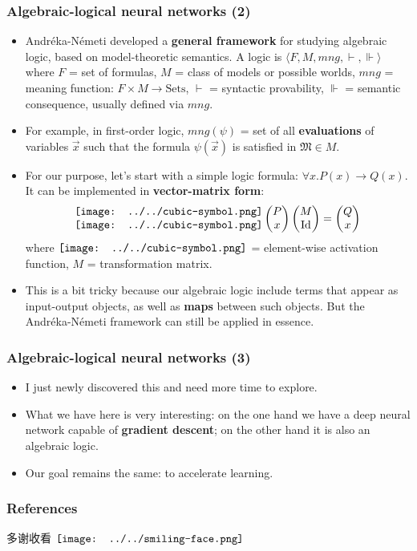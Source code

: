 \documentclass[16pt]{beamer}
\newcommand{\cc}[2]{#1}
\newcommand{\cc}[2]{#2}
\newcommand{\smiley}{$\vcenter{\hbox{\texttt{[image: ../../smiling-face.png]}}}$}
\newcommand{\cubic}{\vcenter{\hbox{\texttt{[image: ../../cubic-symbol.png]}}}}
\begin{document}
\begin{frame}
\frametitle{Algebraic-logical neural networks (2)}
\fontsize{10pt}{8}\selectfont
\begin{itemize}
	\item Andr\'{e}ka-N\'{e}meti \cite{Andreka2021} developed a \textbf{general framework} for studying algebraic logic, based on model-theoretic semantics.  A logic is $\langle F, M, mng, \vdash, \Vdash \rangle$ where $F$ = set of formulas, $M$ = class of models or possible worlds, $mng$ = meaning function: $F \times M \rightarrow \mathrm{Sets}$, $\vdash$ = syntactic provability, $\Vdash$ = semantic consequence, usually defined via $mng$.
	
	\item For example, in first-order logic, $mng(\psi)$ = set of all \textbf{evaluations} of variables $\vec{x}$ such that the formula $\psi(\vec{x})$ is satisfied in $\mathfrak{M} \in M$.

	\item For our purpose, let's start with a simple logic formula: $\forall x. P(x) \rightarrow Q(x)$.  It can be implemented in \textbf{vector-matrix form}:
	\begin{gather}
	\begin{matrix} \cubic \\ \cubic \end{matrix}
	\begin{pmatrix} P \\ x \end{pmatrix}
	\begin{pmatrix} M \\ \mathrm{Id} \end{pmatrix}
	= \begin{pmatrix} Q \\ x \end{pmatrix}
	\nonumber
	\end{gather}
	where $\cubic$ = element-wise activation function, $M$ = transformation matrix.
	
	\item This is a bit tricky because our algebraic logic include terms that appear as input-output objects, as well as \textbf{maps} between such objects.  But the Andr\'{e}ka-N\'{e}meti framework can still be applied in essence.
\end{itemize}
\end{frame}

\begin{frame}
\frametitle{Algebraic-logical neural networks (3)}
\begin{itemize}
	\item I just newly discovered this and need more time to explore.
	
	\item What we have here is very interesting: on the one hand we have a deep neural network capable of \textbf{gradient descent};  on the other hand it is also an algebraic logic.
	
	\item Our goal remains the same: to accelerate learning.  
\end{itemize}
\end{frame}

\begin{frame}
\frametitle{References}
\cc{多谢收看}{Thanks for watching} \smiley \\
\printbibliography
\end{frame}
\end{document}

